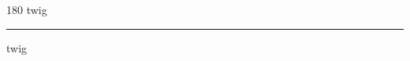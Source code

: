 
\begin{frame}
\begin{center}
\begin{turn}{180}
{\fontsize{2.5cm}{1em}\selectfont twig}
\end{turn}
\vspace{1em}\par  
\hrule
\vspace{1em}\par  
{\fontsize{2.5cm}{1em}\selectfont twig}
\end{center}
\end{frame}
